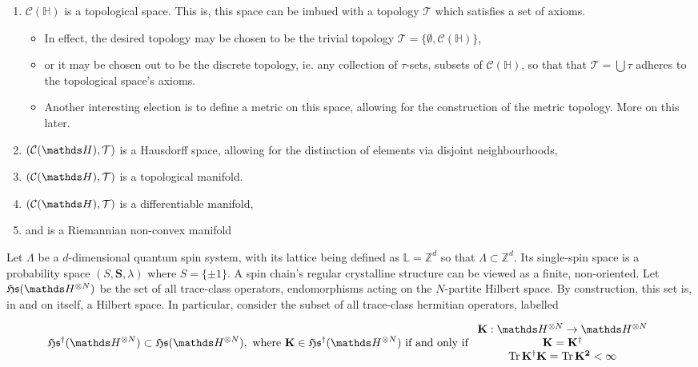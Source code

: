 \documentclass{homework}
\begin{document}
\begin{enumerate}
    \item $\mathcal{C}(\mathds{H})$ is a topological space. This is, this space can be imbued with a topology $\mathcal{T}$ which satisfies a set of axioms. 
    \begin{itemize}
        \item In effect, the desired topology may be chosen to be the trivial topology $\mathcal{T} = \{\emptyset, \mathcal{C}(\mathds{H})\}$,
        \item or it may be chosen out to be the discrete topology, ie. any collection of $\tau$-sets, subsets of $\mathcal{C}(\mathds{H})$, so that that $\mathcal{T} = \bigcup \tau$ adheres to the topological space's axioms. 
        \item Another interesting election is to define a metric on this space, allowing for the construction of the metric topology. More on this later.   
    \end{itemize}
    \item $\topospace$ is a Hausdorff space, allowing for the distinction of elements via disjoint neighbourhoods, 
    \item $\topospace$ is a topological manifold. \item $\topospace$ is a differentiable manifold,
    \item and is a Riemannian non-convex manifold
\end{enumerate}

Let $\Lambda$ be a $d$-dimensional quantum spin system, with its lattice being defined as $\mathds{L} = \mathds{Z}^d$ so that $\Lambda \subset \mathds{Z}^d$. Its single-spin space is a probability space $(S, {\bm S}, \lambda)$ where $S = \{\pm 1\}$. A spin chain's regular crystalline structure can be viewed as a finite, non-oriented. Let $\mathfrak{H}\mathfrak{s}(\hilbert^{\otimes N})$ be the set of all trace-class operators, endomorphisms acting on the $N$-partite Hilbert space. By construction, this set is, in and on itself, a Hilbert space. In particular, consider the subset of all trace-class hermitian operators, labelled 

\begin{equation}
    \mathfrak{H}\mathfrak{s}^{\dagger}(\hilbert^{\otimes N}) \subset \mathfrak{H}\mathfrak{s}(\hilbert^{\otimes N}), \textnormal{ where } {\bf K} \in \mathfrak{H}\mathfrak{s}^{\dagger}(\hilbert^{\otimes N}) \textnormal{ if and only if } \begin{array}{c}
         {\bf K}: \hilbert^{\otimes N} \rightarrow \hilbert^{\otimes N} \\
         {\bf K} = \bf K^\dagger  \\
         \Tr \bf K^\dagger {\bf K} = \Tr \bf K^2 < \infty 
    \end{array}
\end{equation}
\end{document}
